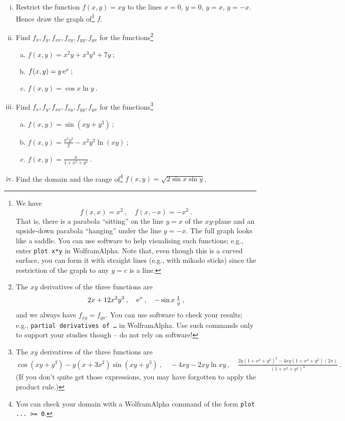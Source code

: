\begin{exercise}
\begin{enumerate}[(i)]
	\item Restrict the function $f(x,y)=xy$ to the lines $x=0$, $y=0$, $y=x$, $y=-x$. Hence draw the graph of\footnote{We have
	\[ f(x,x)=x^2\:, \quad f(x,-x) = -x^2 \:. \]
	That is, there is a parabola ``sitting'' on the line $y=x$ of the $xy$-plane and an upside-down parabola ``hanging'' under the line $y=-x$. The full graph looks like a saddle. You can use software to help visualising such functions; e.g., enter \texttt{plot x*y} in WolframAlpha. Note that, even though this is a curved surface, you can form it with straight lines (e.g., with mikado sticks) since the restriction of the graph to any $y=c$ is a line.} $f$.
	\item Find $f_x,f_y,f_{xx},f_{xy},f_{yy},f_{yx}$ for the functions\footnote{The $xy$ derivatives of the three functions are
	\[ 2x+12x^2y^3 \:, \quad \mathrm{e}^x \:, \quad -\sin x \, \tfrac{1}{y} \:, \]
	and we always have $f_{xy}=f_{yx}$. You can use software to check your results; e.g., \texttt{partial derivatives of \ldots} in WolframAlpha. Use such commands only to support your studies though -- do not rely on software!}
	\begin{enumerate}[(a)]
		\item $f(x,y) = x^2y+x^3y^4 + 7y \:;$
		\item $f(x,y) = y\,\mathrm{e}^x \:;$
		\item $f(x,y) = \cos x \ln y \:.$
	\end{enumerate}
	\item Find $f_x,f_y,f_{xx},f_{xy},f_{yy},f_{yx}$ for the functions\footnote{The $xy$ derivatives of the three functions are
		\[ \cos(xy+y^3) - y (x+3x^2) \sin(xy+y^3) \:, \quad
		-4xy - 2xy \ln xy \:, \quad 
		\tfrac{2y(1+x^2+y^2)^2-4xy(1+x^2+y^2)(2x)}{(1+x^2+y^2)^4} \:. \]
		(If you don't quite get those expressions, you may have forgotten to apply the product rule.)}
	\begin{enumerate}[(a)]
		\item $f(x,y) = \sin \left( xy + y^3 \right) \:;$
		\item $f(x,y) = \frac{x^2y^2}{2}-x^2y^2 \ln (xy) \:;$
		\item $f(x,y) = \frac{x}{1+x^2+y^2} \:.$
	\end{enumerate}
	\item Find the domain and the range of\footnote{You can check your domain with a WolframAlpha command of the form \texttt{plot ... >= 0}.} $f(x,y) =\sqrt{ 2 \sin x \sin y}$. 

\end{enumerate}
\end{exercise}

